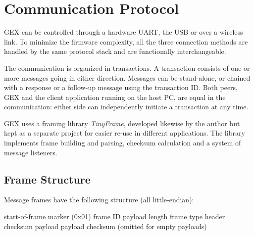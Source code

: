 \chapter{Communication Protocol} \label{sec:tinyframe}

GEX can be controlled through a hardware \gls{UART}, the \gls{USB} or over a wireless link. To minimize the firmware complexity, all the three connection methods are handled by the same protocol stack and are functionally interchangeable.

The communication is organized in transactions. A transaction consists of one or more messages going in either direction. Messages can be stand-alone, or chained with a response or a follow-up message using the transaction ID. Both peers, GEX and the client application running on the host PC, are equal in the communication: either side can independently initiate a transaction at any time.

GEX uses a framing library \textit{TinyFrame}, developed likewise by the author but kept as a separate project for easier re-use in different applications. The library implements frame building and parsing, checksum calculation and a system of message listeners.

\section{Frame Structure}

Message frames have the following structure (all little-endian):

\begin{boxedpayload}
	 start-of-frame marker (0x01)
	 frame ID
	 payload length
	 frame type
	 header checksum	
	 payload
	 payload checksum (omitted for empty payloads)
\end{boxedpayload}

